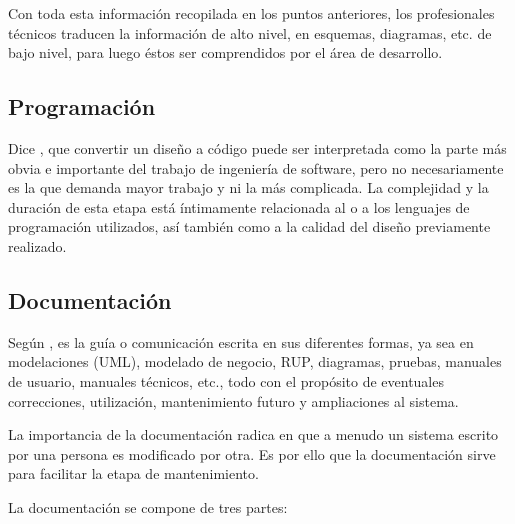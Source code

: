 \documentclass[12pt]{article}
\begin{document}
	\hspace{1.27cm}Con toda esta información recopilada en los puntos anteriores, los profesionales técnicos traducen la información de alto nivel, en esquemas, diagramas, etc. de bajo nivel, para luego éstos ser
	comprendidos por el área de desarrollo.

	\subsection{Programación}

	\hspace{1.27cm}Dice \textcite{maida_metodologias_2015}, que convertir un diseño a código puede ser interpretada como la parte más obvia e importante del trabajo de ingeniería de software, pero no necesariamente es la que demanda mayor trabajo y ni la más complicada. La complejidad y la duración de esta etapa está íntimamente relacionada al o a los lenguajes de programación utilizados, así también como a la calidad del diseño previamente realizado.

	\subsection{Documentación}

	\hspace{1.27cm}Según \textcite{maida_metodologias_2015}, es la guía o comunicación escrita en sus diferentes formas, ya sea en modelaciones (UML), modelado de negocio, RUP, diagramas, pruebas, manuales de usuario, manuales técnicos, etc., todo con el propósito de eventuales correcciones, utilización, mantenimiento futuro y ampliaciones al sistema.

	\hspace{1.27cm}La importancia de la documentación radica en que a menudo un sistema escrito por una persona es modificado por otra. Es por ello que la documentación sirve para facilitar la etapa de mantenimiento.

	\hspace{1.27cm}La documentación se compone de tres partes:
\end{document}
